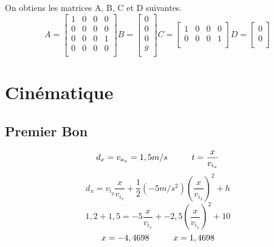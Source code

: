\documentclass{article}
\begin{document}
\newpage
\noindent
On obtiens les matrices A, B, C et D suivantes.
\begin{equation}
	A = 
  	\begin{bmatrix}
  	1 & 0 & 0 & 0 \\ 
  	0 & 0 & 0 & 0 \\
  	0 & 0 & 0 & 1 \\ 
  	0 & 0 & 0 & 0 \\
  	\end{bmatrix}
  	B = 
  	\begin{bmatrix}
  	0 \\ 
  	0 \\ 
  	0 \\ 
  	g \\
  	\end{bmatrix}
  	C =
  	\begin{bmatrix}
  	1 & 0 & 0 & 0 \\ 
  	0 & 0 & 0 & 1 \\
  	\end{bmatrix}
  	D = 
  	\begin{bmatrix}
  	0 \\ 
  	0 \\
  	\end{bmatrix}
\end{equation}
\section{Cinématique}
\subsection{Premier Bon}
\begin{equation}
	d_{x} = v_{a_{x}} = 1,5 m/s \hspace{10mm} t=\frac{x}{v_{i_{x}}}
\end{equation}
\begin{equation}
	d_{x} = {v_{i_{y}}} \frac{x}{v_{i_{x}}} + \frac{1}{2}(-5 m/s^2)(\frac{x}{v_{i_{x}}})^2 + h
\end{equation}
\begin{equation}
	1,2+1,5 = -5 \frac{x}{v_{i_{x}}} + -2,5(\frac{x}{v_{i_{x}}})^2 + 10
\end{equation}
\begin{equation}
	x = -4,4698 \hspace{10mm}
	x = 1,4698
\end{equation}
\end{document}
